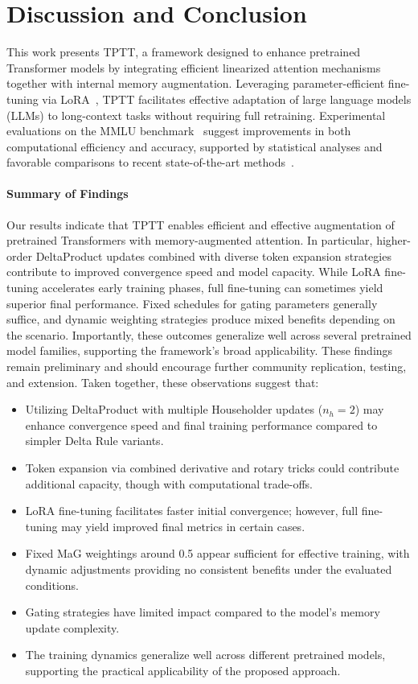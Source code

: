 \documentclass[10pt,a4paper]{article}
\begin{document}
\section{Discussion and Conclusion}

This work presents TPTT, a framework designed to enhance pretrained Transformer models by integrating efficient linearized attention mechanisms together with internal memory augmentation. Leveraging parameter-efficient fine-tuning via LoRA~\cite{hu2022lora}, TPTT facilitates effective adaptation of large language models (LLMs) to long-context tasks without requiring full retraining. Experimental evaluations on the MMLU benchmark~\cite{hendrycks2020measuring} suggest improvements in both computational efficiency and accuracy, supported by statistical analyses and favorable comparisons to recent state-of-the-art methods~\cite{gu2023mamba, zhang2024lolcats, lan2025liger}.

\paragraph{Summary of Findings}  
Our results indicate that TPTT enables efficient and effective augmentation of pretrained Transformers with memory-augmented attention. In particular, higher-order DeltaProduct updates combined with diverse token expansion strategies contribute to improved convergence speed and model capacity. While LoRA fine-tuning accelerates early training phases, full fine-tuning can sometimes yield superior final performance. Fixed schedules for gating parameters generally suffice, and dynamic weighting strategies produce mixed benefits depending on the scenario. Importantly, these outcomes generalize well across several pretrained model families, supporting the framework’s broad applicability. These findings remain preliminary and should encourage further community replication, testing, and extension. Taken together, these observations suggest that:

\begin{itemize}
    \item Utilizing DeltaProduct with multiple Householder updates (\(n_h=2\)) may enhance convergence speed and final training performance compared to simpler Delta Rule variants.
    \item Token expansion via combined derivative and rotary tricks could contribute additional capacity, though with computational trade-offs.
    \item LoRA fine-tuning facilitates faster initial convergence; however, full fine-tuning may yield improved final metrics in certain cases.
    \item Fixed MaG weightings around 0.5 appear sufficient for effective training, with dynamic adjustments providing no consistent benefits under the evaluated conditions.
    \item Gating strategies have limited impact compared to the model’s memory update complexity.
    \item The training dynamics generalize well across different pretrained models, supporting the practical applicability of the proposed approach.
\end{itemize}
\end{document}
